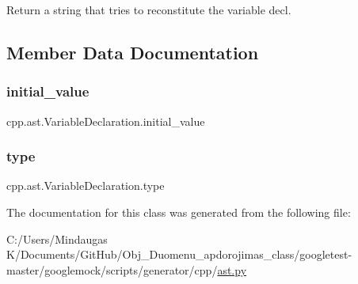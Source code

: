 \begin{DoxyVerb}Return a string that tries to reconstitute the variable decl.\end{DoxyVerb}
 

\subsection{Member Data Documentation}
\mbox{\label{classcpp_1_1ast_1_1_variable_declaration_a7c259ca42a06e264679e8ab66e7ea374}} 
\subsubsection{\texorpdfstring{initial\_value}{initial\_value}}
{\footnotesize\ttfamily cpp.\+ast.\+Variable\+Declaration.\+initial\+\_\+value}

\mbox{\label{classcpp_1_1ast_1_1_variable_declaration_a8c7cc8578ea12f93c6e1c5c6ef4ddf99}} 
\subsubsection{\texorpdfstring{type}{type}}
{\footnotesize\ttfamily cpp.\+ast.\+Variable\+Declaration.\+type}



The documentation for this class was generated from the following file\+:\begin{DoxyCompactItemize}
\item 
C\+:/\+Users/\+Mindaugas K/\+Documents/\+Git\+Hub/\+Obj\+\_\+\+Duomenu\+\_\+apdorojimas\+\_\+class/googletest-\/master/googlemock/scripts/generator/cpp/\mbox{\hyperlink{googletest-master_2googlemock_2scripts_2generator_2cpp_2ast_8py}{ast.\+py}}\end{DoxyCompactItemize}
